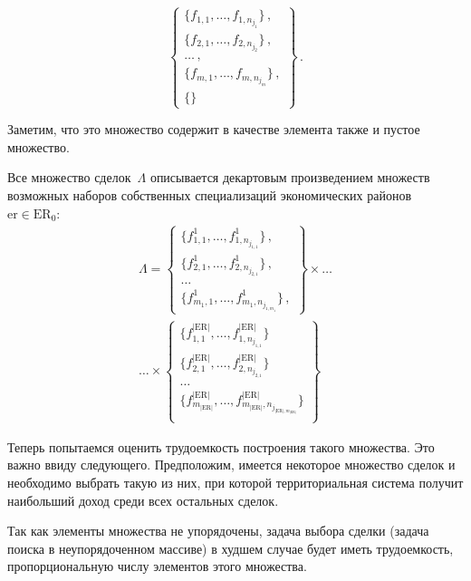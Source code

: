 \begin{multicols}{2}
\noindent
  $$
  \left \{
  \begin{matrix}
  \{f_{1,1}, \ldots , f_{1,n_{j_1}}\}\,,\\
  \{f_{2,1}, \ldots , f_{2,n_{j_2}}\}\,,\\
  \ldots\,,\\
  \{f_{m,1}, \ldots , f_{m,n_{j_m}}\}\,,\\
  \{\}
  \end{matrix}
  \right \}\,.
  $$
  
  Заметим, что это множество содержит в качестве элемента также и пустое 
множество.
  
  Все множество сделок~$\Lambda$ описывается декартовым произведением 
множеств возможных наборов собственных специализаций экономических 
районов $\mathrm{er}\in \mathrm{ER}_0$:
\begin{multline*}
  \Lambda = \left \{
  \begin{matrix}
  \{f^1_{1,1}, \ldots , f^1_{1,n_{j_{1,1}}}\}\,,\\
  \{f^1_{2,1}, \ldots , f^1_{2,n_{j_{2,1}}}\}\,,\\
  \ldots\\
  \{f^1_{m_1,1}, \ldots , f^1_{m_1,n_{j_{1,m_1}}}\}\,,
  \end{matrix}
  \right \}
  \times\ldots\\
  {}\ldots\times
  \left \{
  \begin{matrix}
  \{ f^{\vert \mathrm{ER}\vert}_{1,1},\ldots , f_{1,n_{j_{1,1}}}^{\vert \mathrm{ER}\vert}\}\\
  \{ f^{\vert \mathrm{ER}\vert}_{2,1},\ldots , f_{2,n_{j_{2,1}}}^{\vert \mathrm{ER}\vert}\}\\
  \ldots\\
  \{ f^{\vert \mathrm{ER}\vert}_{m_{\vert \mathrm{ER}\vert }},\ldots , f_{m_{\vert 
\mathrm{ER}\vert},n_{j_{\vert \mathrm{ER}\vert,m_{\vert \mathrm{ER} \vert}}}}^{\vert \mathrm{ER}\vert}\}\\
  \end{matrix}
  \right \}
  \end{multline*}
  
  Теперь попытаемся оценить трудоемкость построения такого множества. Это 
важно ввиду следующего. Предположим, имеется некоторое множество сделок 
и необходимо выбрать такую из них, при которой территориальная система 
получит наибольший доход среди всех остальных сделок.
  
  Так как элементы множества не упорядочены, задача выбора сделки (задача 
поиска в неупорядоченном массиве) в худшем случае будет иметь 
трудоемкость, пропорциональную числу элементов этого множества.
  

\end{multicols}
